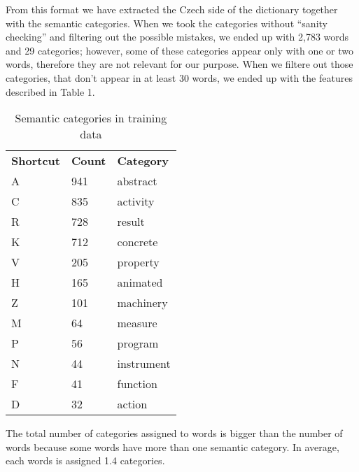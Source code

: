 \documentclass[letterpaper]{article}
\newcommand{\todofn}[1] {
 \footnote{\textbf{TODO : #1}}}
\begin{document}
From this format we have extracted the Czech side of the dictionary together with the semantic categories. 
When we took the categories without ``sanity checking'' and filtering out the possible mistakes, 
we ended up with 2,783 words and 29 categories; however, some of these categories appear only with one or two words, therefore they are not relevant for our purpose. When we filtere out those categories, that don't appear in at least 30 words, we ended up with the features described in Table 1.

\begin{table}
\begin{tabular}{|l|l|l|}
 \hline
\textbf{Shortcut} &  \textbf{Count} & \textbf{Category}\\
A & 941 & abstract \\ \hline
C & 835 & activity \\ \hline
R & 728 & result \\ \hline
K & 712 & concrete \\ \hline
V & 205 & property \\ \hline
H & 165 & animated \\ \hline
Z & 101 & machinery \\ \hline
M & 64 & measure\\ \hline
P & 56 & program \\ \hline
N & 44 & instrument \\ \hline
F & 41 & function \\ \hline
D & 32 & action \\ \hline

\end{tabular}
\caption{Semantic categories in training data}
\end{table}


The total number of categories assigned to words is bigger than the number of words because some words have more than one semantic category. In average, each words is assigned 1.4 categories.


\end{document}

